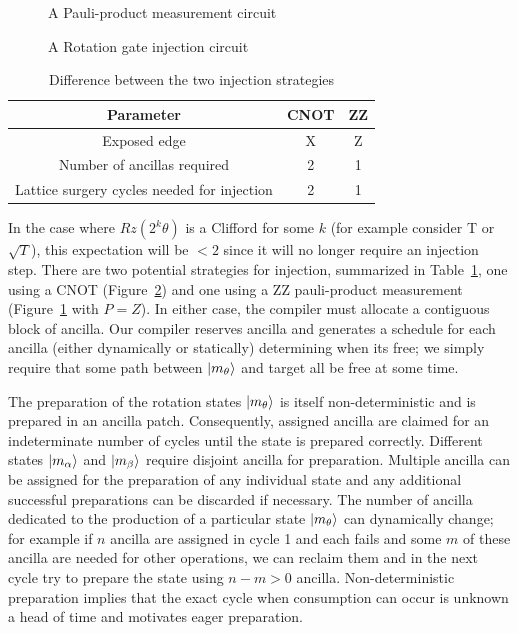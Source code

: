 \begin{figure}
    \centering
    
    \caption{A Pauli-product measurement circuit}
    \label{fig:pauliprod}
\end{figure}
\begin{figure}
    \centering
    
    \caption{A Rotation gate injection circuit}
    \label{fig:rzrotation}
\end{figure}
\begin{table}
    \centering
    \begin{tabular}{|c|c|c|}
        \hline
        Parameter & CNOT & ZZ \\
        \hline
        Exposed edge & X & Z \\
        Number of ancillas required & 2 & 1 \\
        Lattice surgery cycles needed for injection & 2 & 1 \\ %
        \hline
    \end{tabular}
    \caption{Difference between the two injection strategies}
    \label{table:LvsZZ}
\end{table}
In the case where $Rz(2^k\theta)$ is a Clifford for some $k$ (for example consider T or $\sqrt{T}$), this expectation will be $< 2$ since it will no longer require an injection step. There are two potential strategies for injection, summarized in Table~\ref{table:LvsZZ}, one using a CNOT (Figure~\ref{fig:rzrotation}) and one using a ZZ pauli-product measurement (Figure~\ref{fig:pauliprod} with $P = Z$). In either case, the compiler must allocate a contiguous block of ancilla. Our compiler reserves ancilla and generates a schedule for each ancilla (either dynamically or statically) determining when its free; we simply require that some path between $\ket{m_\theta}$ and target all be free at some time.

The preparation of the rotation states $\ket{m_\theta}$ is itself non-deterministic and is prepared in an ancilla patch. Consequently, assigned ancilla are claimed for an indeterminate number of cycles until the state is prepared correctly. Different states $\ket{m_\alpha}$ and $\ket{m_\beta}$ require disjoint ancilla for preparation. Multiple ancilla can be assigned for the preparation of any individual state and any additional successful preparations can be discarded if necessary. The number of ancilla dedicated to the production of a particular state $\ket{m_\theta}$ can dynamically change; for example if $n$ ancilla are assigned in cycle 1 and each fails and some $m$ of these ancilla are needed for other operations, we can reclaim them and in the next cycle try to prepare the state using $n - m > 0$ ancilla. Non-deterministic preparation implies that the exact cycle when consumption can occur is unknown a head of time and motivates eager preparation.


